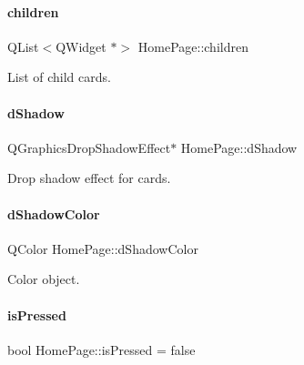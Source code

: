 \paragraph{\texorpdfstring{children}{children}}
{\footnotesize\ttfamily Q\+List$<$Q\+Widget $\ast$$>$ Home\+Page\+::children\hspace{0.3cm}{\ttfamily [private]}}



List of child cards. 

\mbox{\label{classHomePage_a3c355759e9927e080473bd83a56eae07}} 
\paragraph{\texorpdfstring{dShadow}{dShadow}}
{\footnotesize\ttfamily Q\+Graphics\+Drop\+Shadow\+Effect$\ast$ Home\+Page\+::d\+Shadow\hspace{0.3cm}{\ttfamily [private]}}



Drop shadow effect for cards. 

\mbox{\label{classHomePage_aa32d795233f9dcc2783c1c68e3de19c9}} 
\paragraph{\texorpdfstring{dShadowColor}{dShadowColor}}
{\footnotesize\ttfamily Q\+Color Home\+Page\+::d\+Shadow\+Color\hspace{0.3cm}{\ttfamily [private]}}



Color object. 

\mbox{\label{classHomePage_a30d025d463d4fac7cd65e375632c48d8}} 
\paragraph{\texorpdfstring{isPressed}{isPressed}}
{\footnotesize\ttfamily bool Home\+Page\+::is\+Pressed = false\hspace{0.3cm}{\ttfamily [private]}}



